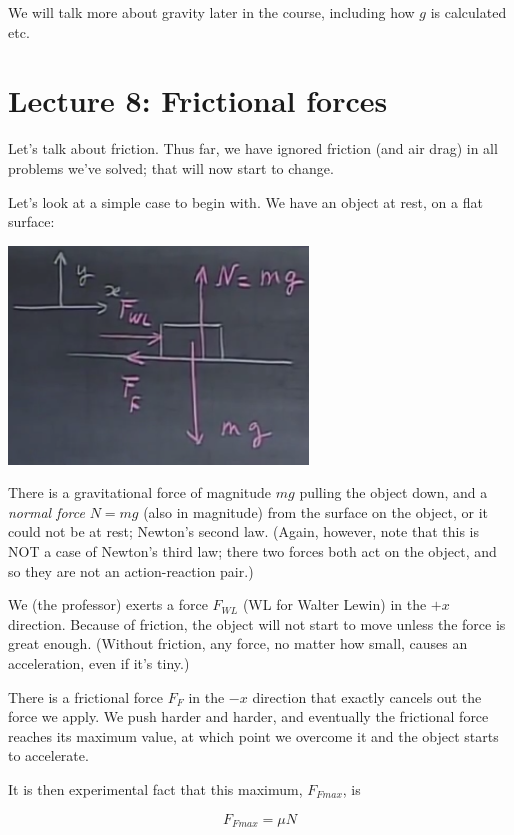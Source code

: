 \documentclass[8.01x]{subfiles}
\begin{document}
We will talk more about gravity later in the course, including how $g$ is calculated etc.

\section{Lecture 8: Frictional forces}

Let's talk about friction. Thus far, we have ignored friction (and air drag) in all problems we've solved; that will now start to change.

Let's look at a simple case to begin with. We have an object at rest, on a flat surface:

\begin{center}
\includegraphics[scale=0.8]{Graphics/lec8_friction}
\end{center}

There is a gravitational force of magnitude $m g$ pulling the object down, and a \emph{normal force} $N = m g$ (also in magnitude) from the surface on the object, or it could not be at rest; Newton's second law. (Again, however, note that this is NOT a case of Newton's third law; there two forces both act on the object, and so they are not an action-reaction pair.)

We (the professor) exerts a force $F_{WL}$ (WL for Walter Lewin) in the $+x$ direction. Because of friction, the object will not start to move unless the force is great enough. (Without friction, any force, no matter how small, causes an acceleration, even if it's tiny.)

There is a frictional force $F_F$ in the $-x$ direction that exactly cancels out the force we apply. We push harder and harder, and eventually the frictional force reaches its maximum value, at which point we overcome it and the object starts to accelerate.

It is then experimental fact that this maximum, $F_{Fmax}$, is

\begin{equation}
F_{Fmax} = \mu N
\end{equation}
\end{document}
